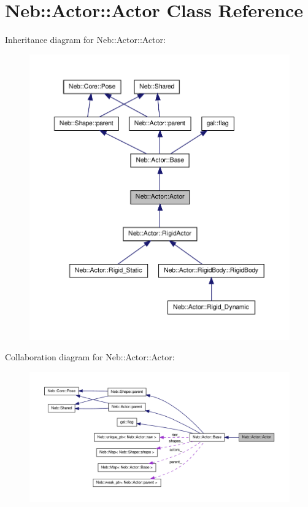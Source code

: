 \hypertarget{classNeb_1_1Actor_1_1Actor}{\section{\-Neb\-:\-:\-Actor\-:\-:\-Actor \-Class \-Reference}
\label{classNeb_1_1Actor_1_1Actor}
}


\-Inheritance diagram for \-Neb\-:\-:\-Actor\-:\-:\-Actor\-:
\nopagebreak
\begin{figure}[H]
\begin{center}
\leavevmode
\includegraphics[width=350pt]{classNeb_1_1Actor_1_1Actor__inherit__graph}
\end{center}
\end{figure}


\-Collaboration diagram for \-Neb\-:\-:\-Actor\-:\-:\-Actor\-:
\nopagebreak
\begin{figure}[H]
\begin{center}
\leavevmode
\includegraphics[width=350pt]{classNeb_1_1Actor_1_1Actor__coll__graph}
\end{center}
\end{figure}
